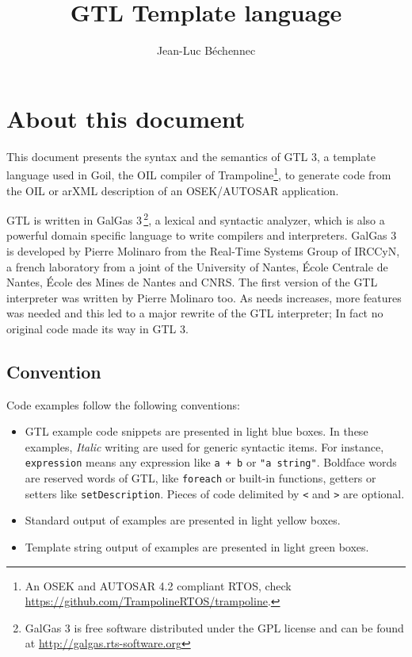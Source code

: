 \documentclass[10pt,openright,twosides]{report}
\title{GTL Template language}
\author{Jean-Luc B\'echennec}
\newcommand{\gtlinline}[1]{\colorbox{light-blue}{\lstinline[language=gtl]{#1}}}
\begin{document}
\maketitle

\tableofcontents

\chapter{About this document}

This document presents the syntax and the semantics of GTL 3, a template language used in Goil, the OIL compiler of Trampoline\footnote{An OSEK and AUTOSAR 4.2 compliant RTOS, check \url{https://github.com/TrampolineRTOS/trampoline}.}, to generate code from the OIL or arXML description of an OSEK/AUTOSAR application.

GTL is written in GalGas 3\,\footnote{GalGas 3 is free software distributed under the GPL license and can be found at \url{http://galgas.rts-software.org}}, a lexical and syntactic analyzer, which is also a powerful domain specific language to write compilers and interpreters. GalGas 3 is developed by Pierre Molinaro from the Real-Time Systems Group of IRCCyN, a french laboratory from a joint of the University of Nantes, \'Ecole Centrale de Nantes, \'Ecole des Mines de Nantes and CNRS. The first version of the GTL interpreter was written by Pierre Molinaro too. As needs increases, more features was needed and this led to a major rewrite of the GTL interpreter; In fact no original code made its way in GTL 3.

\section*{Convention}

Code examples follow the following conventions:
\begin{itemize}
\item GTL example code snippets are presented in \colorbox{light-blue}{light blue boxes}. In these examples, {\em Italic} writing are used for generic syntactic items. For instance, \gtlinline{expression} means any expression like \gtlinline{a + b} or \gtlinline{"a string"}. Boldface words are reserved words of GTL, like \gtlinline{foreach} or built-in functions, getters or setters like \gtlinline{setDescription}. Pieces of code delimited by \gtlinline{<} and \gtlinline{>} are optional.
\item Standard output of examples are presented in \colorbox{light-yellow}{light yellow boxes}.
\item Template string output of examples are presented in \colorbox{light-green}{light green boxes}.
\end{itemize}
\end{document}

